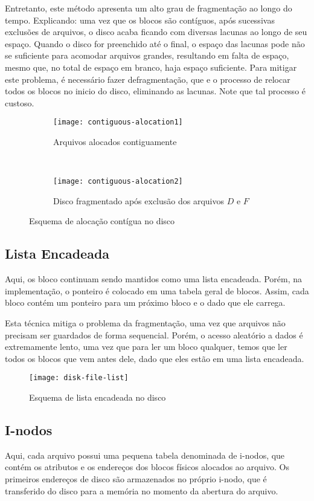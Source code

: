 Entretanto, este método apresenta um alto grau de fragmentação ao longo do tempo. Explicando: uma vez que os blocos são contíguos, após sucessivas exclusões de arquivos, o disco acaba ficando com diversas lacunas ao longo de seu espaço. Quando o disco for preenchido até o final, o espaço das lacunas pode não se suficiente para acomodar arquivos grandes, resultando em falta de espaço, mesmo que, no total de espaço em branco, haja espaço suficiente. Para mitigar este problema, é necessário fazer defragmentação, que e o processo de relocar todos os blocos no inicio do disco, eliminando as lacunas. Note que tal processo é custoso.

\begin{figure*}[h]
  \begin{subfigure}{\textwidth}
    \centering
    \texttt{[image: contiguous-alocation1]}
    \caption{Arquivos alocados contiguamente}
  \end{subfigure}
  ~
  \begin{subfigure}{\textwidth}
    \centering
    \texttt{[image: contiguous-alocation2]}
    \caption{Disco fragmentado após exclusão dos arquivos $D$ e $F$}
  \end{subfigure}

  \caption{Esquema de alocação contígua no disco}
  \label{fig:contiguous-allocation}
\end{figure*}

\subsection{Lista Encadeada}
Aqui, os bloco continuam sendo mantidos como uma lista encadeada. Porém, na implementação, o ponteiro é colocado em uma tabela geral de blocos. Assim, cada bloco contém um ponteiro para um próximo bloco e o dado que ele carrega.

Esta técnica mitiga o problema da fragmentação, uma vez que arquivos não precisam ser guardados de forma sequencial. Porém, o acesso aleatório a dados é extremamente lento, uma vez que para ler um bloco qualquer, temos que ler todos os blocos que vem antes dele, dado que eles estão em uma lista encadeada.

\begin{figure}[h]
  \centering
  \texttt{[image: disk-file-list]}
  \caption{Esquema de lista encadeada no disco}
  \label{fig:disk-file-list}
\end{figure}

\subsection{I-nodos}
Aqui, cada arquivo possui uma pequena tabela denominada de i-nodos, que contém os atributos e os endereços dos blocos físicos alocados ao arquivo. Os primeiros endereços de disco são armazenados no próprio i-nodo, que é transferido do disco para a memória no momento da abertura do arquivo.

